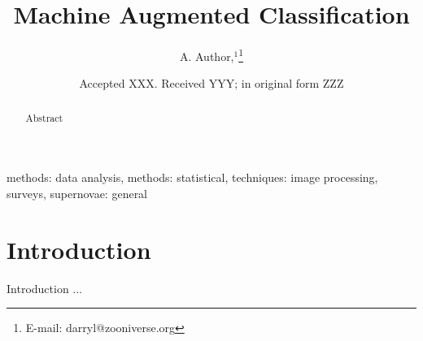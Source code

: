 \documentclass[a4paper,fleqn,usenatbib]{mnras}
\title[Machine Augmented Classification]{Machine Augmented Classification}
\author[A. Author]{A. Author,$^{1}$\thanks{E-mail: darryl@zooniverse.org}
\\
}
\date{Accepted XXX. Received YYY; in original form ZZZ}
\begin{document}
\label{firstpage}
\pagerange{\pageref{firstpage}--\pageref{lastpage}}
\maketitle

\begin{abstract}
Abstract
\end{abstract}

\begin{keywords}
methods: data analysis, methods: statistical, techniques: image processing, surveys, supernovae: general
\end{keywords}



\section{Introduction}

Introduction ...
\end{document}
